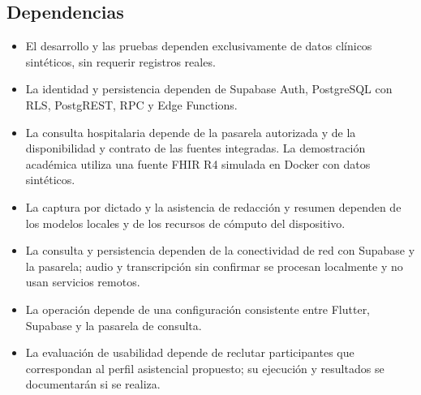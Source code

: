 \subsection{Dependencias}

\begin{itemize}
    \item El desarrollo y las pruebas dependen exclusivamente de datos clínicos sintéticos, sin requerir registros reales.
    \item La identidad y persistencia dependen de Supabase Auth, PostgreSQL con RLS, PostgREST, RPC y Edge Functions.
    \item La consulta hospitalaria depende de la pasarela autorizada y de la disponibilidad y contrato de las fuentes integradas. La demostración académica utiliza una fuente FHIR R4 simulada en Docker con datos sintéticos.
    \item La captura por dictado y la asistencia de redacción y resumen dependen de los modelos locales y de los recursos de cómputo del dispositivo.
    \item La consulta y persistencia dependen de la conectividad de red con Supabase y la pasarela; audio y transcripción sin confirmar se procesan localmente y no usan servicios remotos.
    \item La operación depende de una configuración consistente entre Flutter, Supabase y la pasarela de consulta.
    \item La evaluación de usabilidad depende de reclutar participantes que correspondan al perfil asistencial propuesto; su ejecución y resultados se documentarán si se realiza.
\end{itemize}
